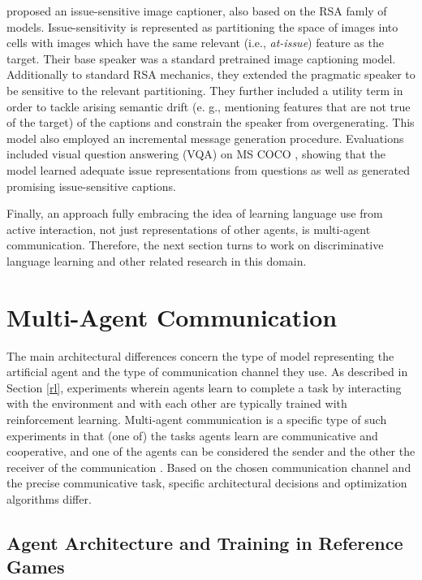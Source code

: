 \cite{nie2020pragmatic} proposed an issue-sensitive image captioner, also based on the RSA famly of models. Issue-sensitivity is represented as partitioning the space of images into cells with images which have the same relevant (i.e., \textit{at-issue}) feature as the target. Their base speaker was a standard  pretrained image captioning model. Additionally to standard RSA mechanics, they extended the pragmatic speaker to be sensitive to the relevant partitioning. They further included a utility term in order to tackle arising semantic drift (e. g., mentioning features that are not true of the target) of the captions and constrain the speaker from overgenerating. This model also employed an incremental message generation procedure. Evaluations included visual question answering (VQA) on MS COCO \parencite{chen2015microsoft}, showing that the model learned adequate issue representations from questions as well as generated promising issue-sensitive captions. 

Finally, an approach fully embracing the idea of learning language use from active interaction, not just representations of other agents,  is multi-agent communication. Therefore, the next section turns to work on discriminative language learning and other related research in this domain.

\section{Multi-Agent Communication}
\label{mac}
The main architectural differences concern the type of model representing the artificial agent and the type of communication channel they use.
As described in Section \ref{rl}, experiments wherein agents learn to complete a task by interacting with the environment and with each other are typically trained with reinforcement learning. Multi-agent communication is a specific type of such experiments in that (one of) the tasks agents learn are communicative and cooperative, and one of the agents can be considered the sender and the other the receiver of the communication \parencite[cf.][]{tan1993multi, lazaridou2016multi}.
Based on the chosen communication channel and the precise communicative task, specific architectural decisions and optimization algorithms differ. 

\subsection{Agent Architecture and Training in Reference Games}
\label{multi_agent_arch}

